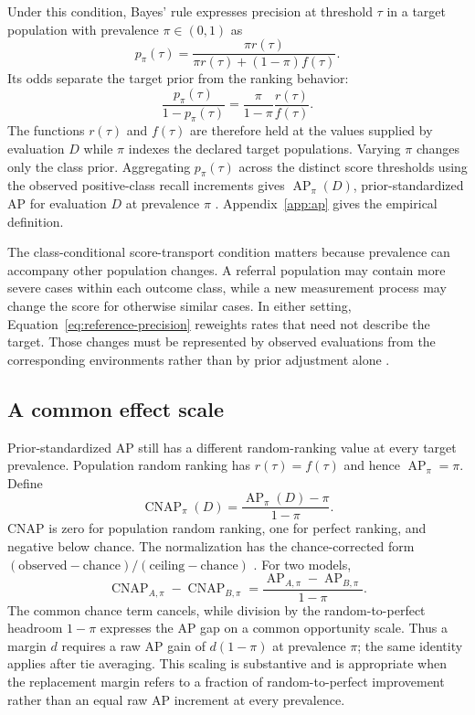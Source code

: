 \documentclass[11pt]{article}
\newcommand{\AP}{\operatorname{AP}}
\newcommand{\CNAP}{\operatorname{CNAP}}
\theoremstyle{remark}
\begin{document}
Under this condition, Bayes' rule expresses precision at threshold $\tau$ in a target population with prevalence $\pi\in(0,1)$ as
\begin{equation}
p_\pi(\tau)
=
\frac{\pi r(\tau)}
{\pi r(\tau)+(1-\pi)f(\tau)}.
\label{eq:reference-precision}
\end{equation}
Its odds separate the target prior from the ranking behavior:
\begin{equation}
\frac{p_\pi(\tau)}{1-p_\pi(\tau)}
=
\frac{\pi}{1-\pi}\frac{r(\tau)}{f(\tau)}.
\label{eq:precision-odds}
\end{equation}
The functions $r(\tau)$ and $f(\tau)$ are therefore held at the values supplied by evaluation $D$ while $\pi$ indexes the declared target populations. Varying $\pi$ changes only the class prior. Aggregating $p_\pi(\tau)$ across the distinct score thresholds using the observed positive-class recall increments gives $\AP_\pi(D)$, prior-standardized AP for evaluation $D$ at prevalence $\pi$ \cite{elkan2001foundations,siblini2020calibration}. Appendix~\ref{app:ap} gives the empirical definition.

The class-conditional score-transport condition matters because prevalence can accompany other population changes. A referral population may contain more severe cases within each outcome class, while a new measurement process may change the score for otherwise similar cases. In either setting, Equation~\eqref{eq:reference-precision} reweights rates that need not describe the target. Those changes must be represented by observed evaluations from the corresponding environments rather than by prior adjustment alone \cite{bareinboim2013transportability}.

\subsection{A common effect scale}

Prior-standardized AP still has a different random-ranking value at every target prevalence. Population random ranking has $r(\tau)=f(\tau)$ and hence $\AP_\pi=\pi$. Define
\begin{equation}
\CNAP_\pi(D)
=
\frac{\AP_\pi(D)-\pi}{1-\pi}.
\label{eq:cnap}
\end{equation}
CNAP is zero for population random ranking, one for perfect ranking, and negative below chance. The normalization has the chance-corrected form $(\text{observed}-\text{chance})/(\text{ceiling}-\text{chance})$ \cite{cohen1960coefficient}. For two models,
\begin{equation}
\CNAP_{A,\pi}-\CNAP_{B,\pi}
=
\frac{\AP_{A,\pi}-\AP_{B,\pi}}{1-\pi}.
\label{eq:cnap-difference}
\end{equation}
The common chance term cancels, while division by the random-to-perfect headroom $1-\pi$ expresses the AP gap on a common opportunity scale. Thus a margin $d$ requires a raw AP gain of $d(1-\pi)$ at prevalence $\pi$; the same identity applies after tie averaging. This scaling is substantive and is appropriate when the replacement margin refers to a fraction of random-to-perfect improvement rather than an equal raw AP increment at every prevalence.
\end{document}
